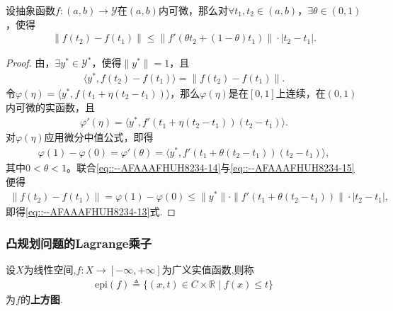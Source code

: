 \documentclass[../../main.tex]{subfiles}%
\begin{document}
\begin{theorem}
设抽象函数$f: (a,b) \to \mathscr{Y}$在$(a,b)$内可微，那么对$\forall t_1, t_2 \in (a,b)$，$\exists \theta \in (0,1)$，使得
\begin{align}
\|f(t_2) - f(t_1)\| \leqslant \|f'(\theta t_2 + (1 - \theta)t_1)\| \cdot |t_2 - t_1|.
\label{eq::--AFAAAFHUH8234-13}
\end{align}
\end{theorem}
\begin{proof}
由，$\exists y^* \in \mathscr{Y}^*$，使得$\|y^*\| = 1$，且
\begin{align}
\langle y^*, f(t_2) - f(t_1) \rangle = \|f(t_2) - f(t_1)\|.
\label{eq::--AFAAAFHUH8234-14}
\end{align}
令$\varphi(\eta) = \langle y^*, f(t_1 + \eta(t_2 - t_1)) \rangle$，那么$\varphi(\eta)$是在$[0,1]$上连续，在$(0,1)$内可微的实函数，且
\begin{align*}
\varphi'(\eta) = \langle y^*, f'(t_1 + \eta(t_2 - t_1))(t_2 - t_1) \rangle.
\end{align*}
对$\varphi(\eta)$应用微分中值公式，即得
\begin{align}
\varphi(1) - \varphi(0) = \varphi'(\theta)  
= \langle y^*, f'(t_1 + \theta(t_2 - t_1))(t_2 - t_1) \rangle,
\label{eq::--AFAAAFHUH8234-15}
\end{align}
其中$0 < \theta < 1$。联合\eqref{eq::--AFAAAFHUH8234-14}与\eqref{eq::--AFAAAFHUH8234-15}便得
\begin{align*}
\|f(t_2) - f(t_1)\| = \varphi(1) - \varphi(0) 
\leqslant \|y^*\| \cdot \|f'(t_1 + \theta(t_2 - t_1))\| \cdot |t_2 - t_1|,
\end{align*}
即得\eqref{eq::--AFAAAFHUH8234-13}式.
\end{proof}

\subsubsection{凸规划问题的Lagrange乘子}

\begin{definition}[上方图]
设$X$为线性空间,$f:X\to [-\infty,+\infty]$为广义实值函数,则称
\begin{align*}
\mathrm{epi}(f) \triangleq \{ (x,t) \in C \times \mathbb{R} \mid f(x) \leqslant t \}
\end{align*}
为$f$的\textbf{上方图}.
\end{definition}
\end{document}
